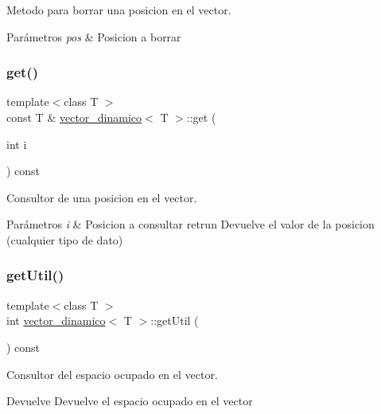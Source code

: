 Metodo para borrar una posicion en el vector. 


\begin{DoxyParams}{Parámetros}
{\em pos} & Posicion a borrar \\
\hline
\end{DoxyParams}
\mbox{\label{classvector__dinamico_ae774d0b2ea36fe4c6bd225a6a7d5c6ec}} 
\subsubsection{\texorpdfstring{get()}{get()}}
{\footnotesize\ttfamily template$<$class T $>$ \\
const T \& \hyperlink{classvector__dinamico}{vector\+\_\+dinamico}$<$ T $>$\+::get (\begin{DoxyParamCaption}\item[{int}]{i }\end{DoxyParamCaption}) const}



Consultor de una posicion en el vector. 


\begin{DoxyParams}{Parámetros}
{\em i} & Posicion a consultar retrun Devuelve el valor de la posicion (cualquier tipo de dato) \\
\hline
\end{DoxyParams}
\mbox{\label{classvector__dinamico_a0cae31353cf2dbcdc0dbd37dafdf52de}} 
\subsubsection{\texorpdfstring{get\+Util()}{getUtil()}}
{\footnotesize\ttfamily template$<$class T $>$ \\
int \hyperlink{classvector__dinamico}{vector\+\_\+dinamico}$<$ T $>$\+::get\+Util (\begin{DoxyParamCaption}{ }\end{DoxyParamCaption}) const}



Consultor del espacio ocupado en el vector. 

\begin{DoxyReturn}{Devuelve}
Devuelve el espacio ocupado en el vector 
\end{DoxyReturn}
\mbox{\label{classvector__dinamico_a5b60524afb2974c19d06d954064cd356}} 
